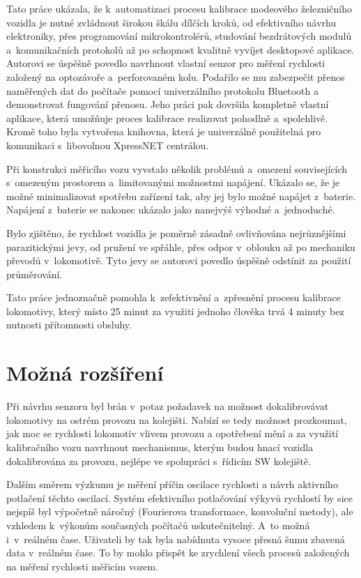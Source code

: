 Tato práce ukázala, že k~automatizaci procesu kalibrace modeového železničního
vozidla je nutné zvládnout širokou škálu dílčích kroků, od efektivního návrhu
elektroniky, přes programování mikrokontrolérů, studování bezdrátových modulů
a~komunikačních protokolů až po schopnost kvalitně vyvíjet desktopové aplikace.
Autorovi se úspěšně povedlo navrhnout vlastní senzor pro měření rychlosti
založený na optozávoře a~perforovaném kolu. Podařilo se mu zabezpečit přenos
naměřených dat do počítače pomocí univerzálního protokolu Bluetooth a
demonstrovat fungování přenosu. Jeho práci pak dovršila kompletně vlastní
aplikace, která umožňuje proces kalibrace realizovat pohodlně a~spolehlivě.
Kromě toho byla vytvořena knihovna, která je univerzálně použitelná pro
komunikaci s~libovolnou XpressNET centrálou.

Při konstrukci měřicího vozu vyvstalo několik problémů a~omezení souvisejících
s~omezeným prostorem a~limitovanými možnostmi napájení. Ukázalo se, že je možné
minimalizovat spotřebu zařízení tak, aby jej bylo možné napájet z~baterie.
Napájení z~baterie se nakonec ukázalo jako nanejvýš výhodné a~jednoduché.

Bylo zjištěno, že rychlost vozidla je poměrně zásadně ovlivňována nejrůznějšími
parazitickými jevy, od pružení ve spřáhle, přes odpor v~oblouku až po mechaniku
převodů v~lokomotivě. Tyto jevy se autorovi povedlo úspěšně odstínit za použití
průměrování.

Tato práce jednoznačně pomohla k~zefektivnění a~zpřesnění procesu kalibrace
lokomotivy, který místo 25 minut za využití jednoho člověka trvá 4 minuty
bez nutnosti přítomnosti obsluhy.

\section{Možná rozšíření}

Při návrhu senzoru byl brán v~potaz požadavek na možnost dokalibrovávat
lokomotivy na ostrém provozu na kolejišti. Nabízí se tedy možnost prozkoumat,
jak moc se rychlosti lokomotiv vlivem provozu a opotřebení mění a za využití
kalibračního vozu navrhnout mechanismus, kterým budou hnací vozidla
dokalibrována za provozu, nejlépe ve spolupráci s~řídicím SW kolejiště.

Dalším směrem výzkumu je měření příčin oscilace rychlosti a návrh
aktivního potlačení těchto oscilací. Systém efektivního potlačování výkyvů
rychlostí by sice nejspíš byl výpočetně náročný (Fourierova transformace,
konvoluční metody), ale vzhledem k~výkonům současných počítačů uskutečnitelný.
A~to možná i~v~reálném čase. Uživateli by tak byla nabídnuta vysoce přesná šumu
zbavená data v~reálném čase. To by mohlo přispět ke zrychlení všech procesů
založených na měření rychlosti měřicím vozem.
